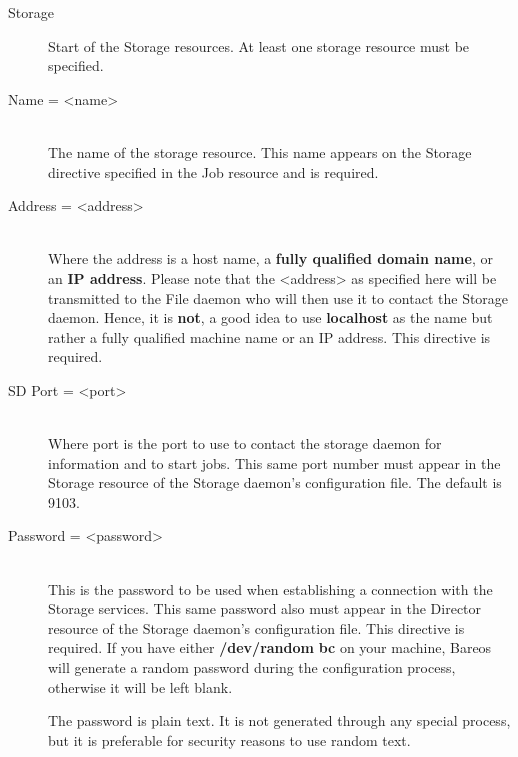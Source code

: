 \begin{description}

\item [Storage]
Start of the Storage resources. At least one  storage resource must be
specified.

\item [Name = {\textless}name{\textgreater}] \hfill \\
The name of the storage resource. This  name appears on the Storage directive
specified in the Job resource and is required.

\item [Address = {\textless}address{\textgreater}] \hfill \\
Where the address is a host name,  a {\bf fully qualified domain name}, or an
{\bf IP address}. Please note  that the {\textless}address{\textgreater} as specified here
will be transmitted to  the File daemon who will then use it to contact the
Storage daemon. Hence,  it is {\bf not}, a good idea to use {\bf localhost} as
the  name but rather a fully qualified machine name or an IP address.  This
directive is required.

\item [SD Port = {\textless}port{\textgreater}] \hfill \\
Where port is the port to use to  contact the storage daemon for information
and to start jobs.  This same port number must appear in the Storage resource
of the  Storage daemon's configuration file. The default is 9103.

\item [Password = {\textless}password{\textgreater}] \hfill \\
This is the password to be used  when establishing a connection with the
Storage services. This  same password also must appear in the Director
resource of the Storage  daemon's configuration file. This directive is
required.  If you have either {\bf /dev/random}  {\bf bc} on your machine,
Bareos will generate a random  password during the configuration process,
otherwise it will  be left blank.

The password is plain text.  It is not generated through any special
process, but it is preferable for security reasons to use random text.


\end{description}
